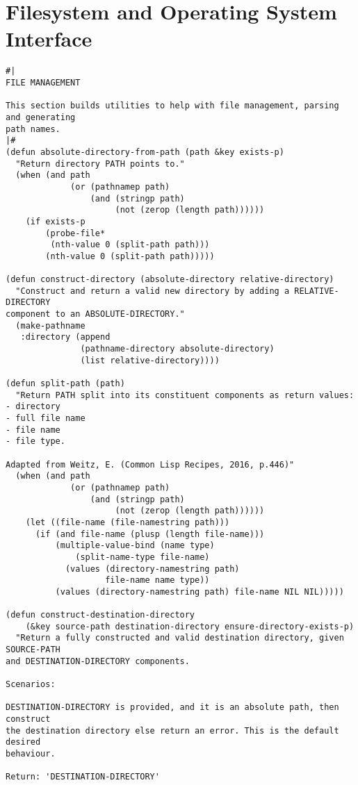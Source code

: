 \documentclass{article}
\begin{document}
\section{Filesystem and Operating System Interface}
\label{sec:org40b9325}

\begin{verbatim}
#|
FILE MANAGEMENT

This section builds utilities to help with file management, parsing and generating
path names.
|#
(defun absolute-directory-from-path (path &key exists-p)
  "Return directory PATH points to."
  (when (and path
             (or (pathnamep path)
                 (and (stringp path)
                      (not (zerop (length path))))))
    (if exists-p
        (probe-file*
         (nth-value 0 (split-path path)))
        (nth-value 0 (split-path path)))))

(defun construct-directory (absolute-directory relative-directory)
  "Construct and return a valid new directory by adding a RELATIVE-DIRECTORY
component to an ABSOLUTE-DIRECTORY."
  (make-pathname
   :directory (append
               (pathname-directory absolute-directory)
               (list relative-directory))))

(defun split-path (path)
  "Return PATH split into its constituent components as return values:
- directory
- full file name
- file name
- file type.

Adapted from Weitz, E. (Common Lisp Recipes, 2016, p.446)"
  (when (and path
             (or (pathnamep path)
                 (and (stringp path)
                      (not (zerop (length path))))))
    (let ((file-name (file-namestring path)))
      (if (and file-name (plusp (length file-name)))
          (multiple-value-bind (name type)
              (split-name-type file-name)
            (values (directory-namestring path)
                    file-name name type))
          (values (directory-namestring path) file-name NIL NIL)))))

(defun construct-destination-directory
    (&key source-path destination-directory ensure-directory-exists-p) 
  "Return a fully constructed and valid destination directory, given SOURCE-PATH
and DESTINATION-DIRECTORY components.

Scenarios:

DESTINATION-DIRECTORY is provided, and it is an absolute path, then construct
the destination directory else return an error. This is the default desired
behaviour.

Return: 'DESTINATION-DIRECTORY'


\end{verbatim}
\end{document}
